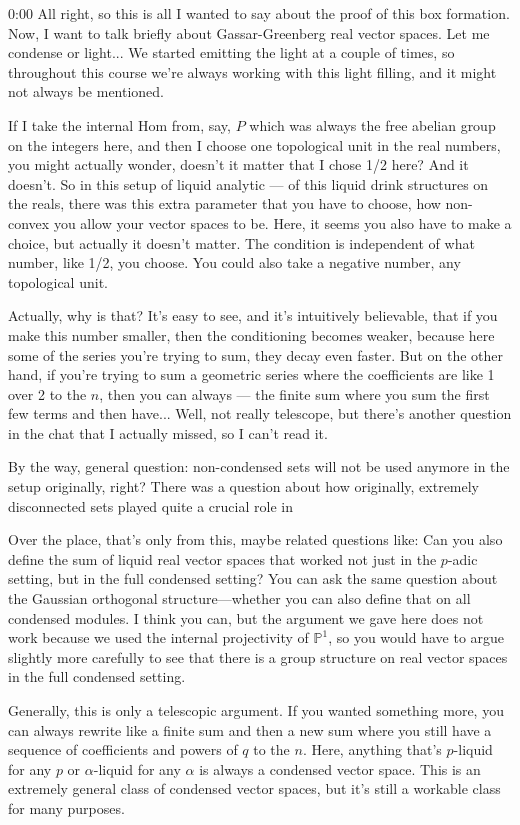 \begin{unfinished}{0:00}
All right, so this is all I wanted to say about the proof of this box formation. Now, I want to talk briefly about Gassar-Greenberg real vector spaces. Let me condense or light... We started emitting the light at a couple of times, so throughout this course we're always working with this light filling, and it might not always be mentioned.

If I take the internal Hom from, say, $P$ which was always the free abelian group on the integers here, and then I choose one topological unit in the real numbers, you might actually wonder, doesn't it matter that I chose 1/2 here? And it doesn't. So in this setup of liquid analytic --- of this liquid drink structures on the reals, there was this extra parameter that you have to choose, how non-convex you allow your vector spaces to be. Here, it seems you also have to make a choice, but actually it doesn't matter. The condition is independent of what number, like 1/2, you choose. You could also take a negative number, any topological unit.

Actually, why is that? It's easy to see, and it's intuitively believable, that if you make this number smaller, then the conditioning becomes weaker, because here some of the series you're trying to sum, they decay even faster. But on the other hand, if you're trying to sum a geometric series where the coefficients are like 1 over 2 to the $n$, then you can always --- the finite sum where you sum the first few terms and then have... Well, not really telescope, but there's another question in the chat that I actually missed, so I can't read it.

By the way, general question: non-condensed sets will not be used anymore in the setup originally, right? There was a question about how originally, extremely disconnected sets played quite a crucial role in

Over the place, that's only from this, maybe related questions like: Can you also define the sum of liquid real vector spaces that worked not just in the $p$-adic setting, but in the full condensed setting? You can ask the same question about the Gaussian orthogonal structure---whether you can also define that on all condensed modules. I think you can, but the argument we gave here does not work because we used the internal projectivity of $\mathbb{P}^1$, so you would have to argue slightly more carefully to see that there is a group structure on real vector spaces in the full condensed setting.

Generally, this is only a telescopic argument. If you wanted something more, you can always rewrite like a finite sum and then a new sum where you still have a sequence of coefficients and powers of $q$ to the $n$. Here, anything that's $p$-liquid for any $p$ or $\alpha$-liquid for any $\alpha$ is always a condensed vector space. This is an extremely general class of condensed vector spaces, but it's still a workable class for many purposes.


\end{unfinished}
